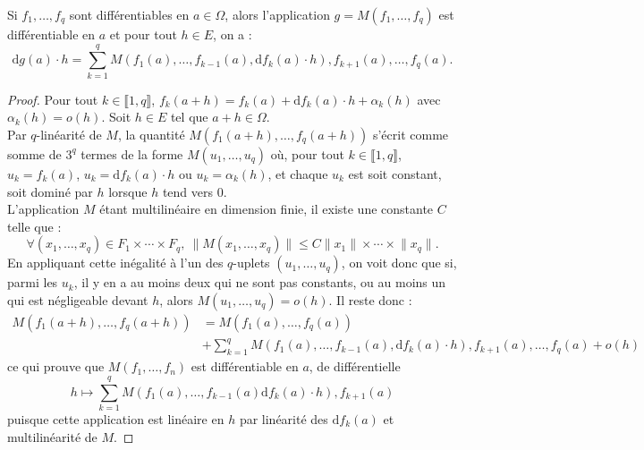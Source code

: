 \documentclass[french]{article}
\renewcommand{\d}{\text{d}}
\theoremstyle{plain}
\theoremstyle{definition}
\theoremstyle{remark}
\begin{document}
\begin{prop}%
	Si $f_1,\ldots,f_q$ sont différentiables en $a\in\Omega$, alors l'application $g=M(f_1,\ldots,f_q)$ est différentiable en $a$ et pour tout $h\in E$, on a :
	$$\d g(a)\cdot h=\sum_{k=1}^{q}M(f_1(a),\ldots,f_{k-1}(a),\d f_k(a)\cdot h),f_{k+1}(a),\ldots,f_q(a).$$
\end{prop}
\begin{proof}
	Pour tout $k\in\llbracket1,q\rrbracket$, $f_k(a+h)=f_k(a)+\d f_k(a)\cdot h+\alpha_k(h)$ avec $\alpha_k(h)=o(h)$. Soit $h\in E$ tel que $a+h\in\Omega$. \\
	Par $q$-linéarité de $M$, la quantité $M(f_1(a+h),\ldots,f_q(a+h))$ s'écrit comme somme de $3^q$ termes de la forme $M(u_1,\ldots,u_q)$ où, pour tout $k\in\llbracket1,q\rrbracket$, $u_k=f_k(a)$, $u_k=\d f_k(a)\cdot h$ ou $u_k=\alpha_k(h)$, et chaque $u_k$ est soit constant, soit dominé par $h$ lorsque $h$ tend vers $0$. \\
	L'application $M$ étant multilinéaire en dimension finie, il existe une constante $C$ telle que :
	$$\forall (x_1,\ldots,x_q)\in F_1\times\cdots\times F_q,\ \lVert M(x_1,\ldots,x_q)\rVert\leqslant C\lVert x_1\rVert\times\cdots\times\lVert x_q\rVert.$$
	En appliquant cette inégalité à l'un des $q$-uplets $(u_1,\ldots,u_q)$, on voit donc que si, parmi les $u_k$, il y en a au moins deux qui ne sont pas constants, ou au moins un qui est négligeable devant $h$, alors $M(u_1,\ldots,u_q)=o(h)$. Il reste donc :
	\begin{align*}
		M(f_1(a+h),\ldots,f_q(a+h))&=M(f_1(a),\ldots,f_q(a))\\&+\sum_{k=1}^{q}M(f_1(a),\ldots,f_{k-1}(a),\d f_k(a)\cdot h),f_{k+1}(a),\ldots,f_q(a)+o(h)
	\end{align*}
	ce qui prouve que $M(f_1,\ldots,f_n)$ est différentiable en $a$, de différentielle 
	$$h\mapsto \sum_{k=1}^{q}M(f_1(a),\ldots,f_{k-1}(a)\d f_k(a)\cdot h),f_{k+1}(a)$$ puisque cette application est linéaire en $h$ par linéarité des $\d f_k(a)$ et multilinéarité de $M$.
\end{proof}
\end{document}
